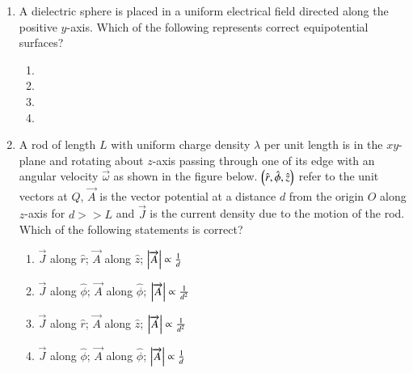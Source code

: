 \documentclass[journal]{IEEEtran}
\begin{document}
\begin{enumerate}
    \item A dielectric sphere is placed in a uniform electrical field directed along the positive $y$-axis. Which of the following represents correct equipotential surfaces?

        \begin{multicols}{2}
            \begin{enumerate}
                \item 
                \item 
                \item 
                \item 
            \end{enumerate}
        \end{multicols}

    \item A rod of length $L$ with uniform charge density $\lambda$ per unit length is in the $xy$-plane and rotating about $z$-axis passing through one of its edge with an angular velocity $\overrightarrow{\omega}$ as shown in the figure below. $\left(\hat{r}, \hat{\phi}, \hat{z}\right)$ refer to the unit vectors at $Q$, $\overrightarrow{A}$ is the vector potential at a distance $d$ from the origin $O$ along $z$-axis for $d>>L$ and $\overrightarrow{J}$ is the current density due to the motion of the rod. Which of the following statements is correct?

    \begin{center}
        
    \end{center}

    \begin{multicols}{2}
        \begin{enumerate}
            \item $\overrightarrow{J}$ along $\hat{r}$; $\overrightarrow{A}$ along $\hat{z}$; $\left\vert\overrightarrow{A}\right\vert\propto\frac{1}{d}$
            \item $\overrightarrow{J}$ along $\hat{\phi}$; $\overrightarrow{A}$ along $\hat{\phi}$; $\left\vert\overrightarrow{A}\right\vert\propto\frac{1}{d^2}$
            \item $\overrightarrow{J}$ along $\hat{r}$; $\overrightarrow{A}$ along $\hat{z}$; $\left\vert\overrightarrow{A}\right\vert\propto\frac{1}{d^2}$
            \item $\overrightarrow{J}$ along $\hat{\phi}$; $\overrightarrow{A}$ along $\hat{\phi}$; $\left\vert\overrightarrow{A}\right\vert\propto\frac{1}{d}$
        \end{enumerate}
    \end{multicols}


\end{enumerate}
\end{document}
